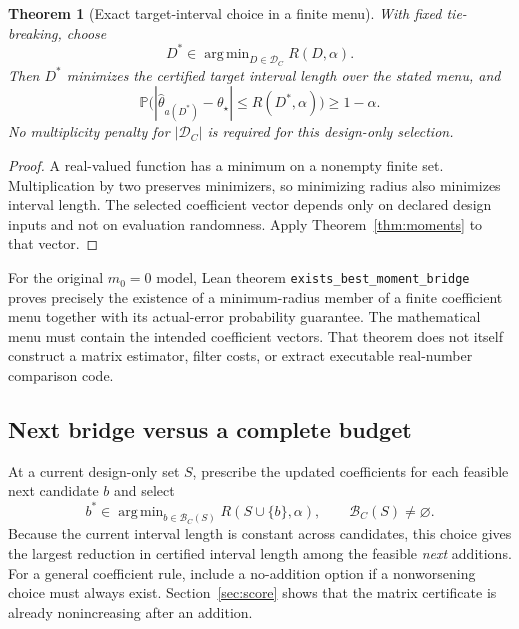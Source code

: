 \documentclass[11pt]{article}
\newtheorem{theorem}{Theorem}
\theoremstyle{remark}
\newcommand{\Prob}{\mathbb P}
\DeclareMathOperator*{\argmin}{arg\,min}
\begin{document}
\begin{theorem}[Exact target-interval choice in a finite menu]\label{thm:finite}
With fixed tie-breaking, choose
\begin{equation}
 D^*\in\argmin_{D\in\mathcal D_C}R(D,\alpha).                   \label{eq:menu}
\end{equation}
Then $D^*$ minimizes the certified target interval length over the stated menu, and
\[
 \Prob\bigl(|\widehat\theta_{a(D^*)}-\theta_\star|
                       \le R(D^*,\alpha)\bigr)\ge1-\alpha.
\]
No multiplicity penalty for $|\mathcal D_C|$ is required for this design-only selection.
\end{theorem}
\begin{proof}
A real-valued function has a minimum on a nonempty finite set. Multiplication by two preserves minimizers, so minimizing radius also minimizes interval length. The selected coefficient vector depends only on declared design inputs and not on evaluation randomness. Apply Theorem~\ref{thm:moments} to that vector.
\end{proof}

For the original $m_0=0$ model, Lean theorem
\texttt{exists\_best\_moment\_bridge} proves precisely the existence of a minimum-radius member of a finite coefficient menu together with its actual-error probability guarantee. The mathematical menu must contain the intended coefficient vectors. That theorem does not itself construct a matrix estimator, filter costs, or extract executable real-number comparison code.

\subsection{Next bridge versus a complete budget}
At a current design-only set $S$, prescribe the updated coefficients for each feasible next candidate $b$ and select
\begin{equation}
 b^*\in\argmin_{b\in\mathcal B_C(S)}R(S\cup\{b\},\alpha),
 \qquad \mathcal B_C(S)\ne\varnothing.                         \label{eq:next}
\end{equation}
Because the current interval length is constant across candidates, this choice gives the largest reduction in certified interval length among the feasible \emph{next} additions. For a general coefficient rule, include a no-addition option if a nonworsening choice must always exist. Section~\ref{sec:score} shows that the matrix certificate is already nonincreasing after an addition.
\end{document}

